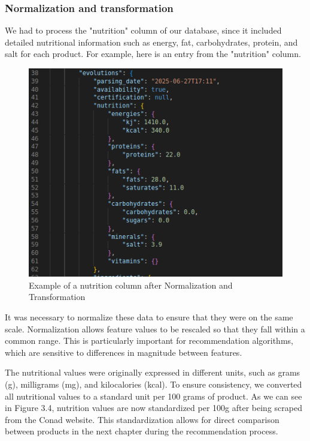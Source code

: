 \subsubsection{Normalization and transformation}

We had to process the "nutrition" column of our database, since it included detailed nutritional information such as energy, fat, carbohydrates,
protein, and salt for each product. For example, here is an entry from
the "nutrition" column.

\begin{center}
\begin{figure}[H]
    \centering
    \includegraphics[scale=0.45]{images/transform_nutrition.png}
    \caption{Example of a nutrition column after Normalization and Transformation} 
    \label{fig:Normalization_nutrition}
\end{figure}
\end{center}

\par It was necessary to normalize these data to ensure that they were on
the same scale. Normalization allows feature values to be rescaled so
that they fall within a common range. This is particularly important
for recommendation algorithms, which are sensitive to differences in
magnitude between features.

\par The nutritional values were originally expressed in different units, such as
grams (g), milligrams (mg), and kilocalories (kcal). To ensure consistency,
we converted all nutritional values to a standard unit per 100 grams
of product. As we can see in Figure 3.4, nutrition values are now
standardized per 100g after being scraped from the Conad website. This
standardization allows for direct comparison between products in the
next chapter during the recommendation process.

